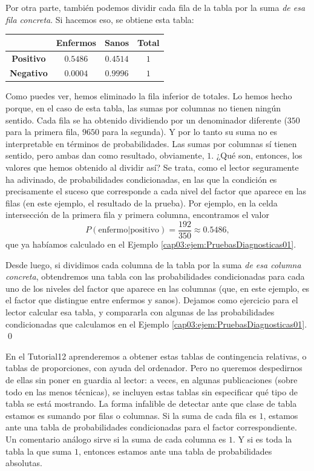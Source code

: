 \begin{ejemplo}
Por otra parte, también podemos dividir cada fila de la tabla por la suma {\em de esa fila concreta}. Si hacemos eso, se obtiene esta tabla:
    \begin{center}
    \begin{tabular}{|c|c|c|c|}
      \hline
       &{\bf Enfermos }&{\bf Sanos }& Total \\
       \hline
      {\bf Positivo} & $0.5486$ & $0.4514$ & $1$ \\
      \hline
      {\bf Negativo }&  $0.0004$ & $0.9996$ & $1$ \\
      \hline
    \end{tabular}
    \end{center}
Como puedes ver, hemos eliminado la fila inferior de totales. Lo hemos hecho porque, en el caso de esta tabla, las sumas por columnas no tienen ningún sentido. Cada fila se ha obtenido dividiendo por un denominador diferente ($350$ para la primera fila, $9650$ para la segunda). Y por lo tanto su suma no es interpretable en términos de probabilidades. Las sumas por columnas sí tienen sentido, pero ambas dan como resultado, obviamente, $1$. ¿Qué son, entonces, los valores que hemos obtenido al dividir así? Se trata, como el lector seguramente ha adivinado, de probabilidades condicionadas, en las que la condición es precisamente el suceso que corresponde a cada nivel del factor que aparece en las filas (en este ejemplo, el resultado de la prueba). Por ejemplo, en la celda intersección de la primera fila y primera columna, encontramos el valor
\[P\left(\mbox{enfermo} | \mbox{positivo}\right)=\dfrac{192}{350}\approx 0.5486,\]
que ya habíamos calculado en el Ejemplo \ref{cap03:ejem:PruebasDiagnosticas01}.

Desde luego, si dividimos cada columna de la tabla por la suma {\em de esa columna concreta}, obtendremos una tabla con las probabilidades condicionadas para cada uno de los niveles del factor que aparece en las columnas (que, en este ejemplo, es el factor que distingue entre enfermos y sanos). Dejamos como ejercicio para el lector calcular esa tabla, y compararla con algunas de las probabilidades condicionadas que calculamos en el Ejemplo \ref{cap03:ejem:PruebasDiagnosticas01}.
\qed
\end{ejemplo}
En el Tutorial12 aprenderemos a obtener estas {\sf tablas de contingencia relativas}, o {\sf tablas de proporciones}, con ayuda del ordenador. Pero no queremos despedirnos de ellas sin poner en guardia al lector: a veces, en algunas publicaciones (sobre todo en las menos técnicas), se incluyen estas tablas sin especificar qué tipo de tabla se está mostrando. La forma infalible de detectar ante que clase de tabla estamos es sumando por filas o columnas. Si la suma de cada fila es $1$, estamos ante una tabla de probabilidades condicionadas para el factor correspondiente. Un comentario análogo sirve si la suma de cada columna es $1$. Y si es toda la tabla la que suma $1$, entonces estamos ante una tabla de probabilidades absolutas.

